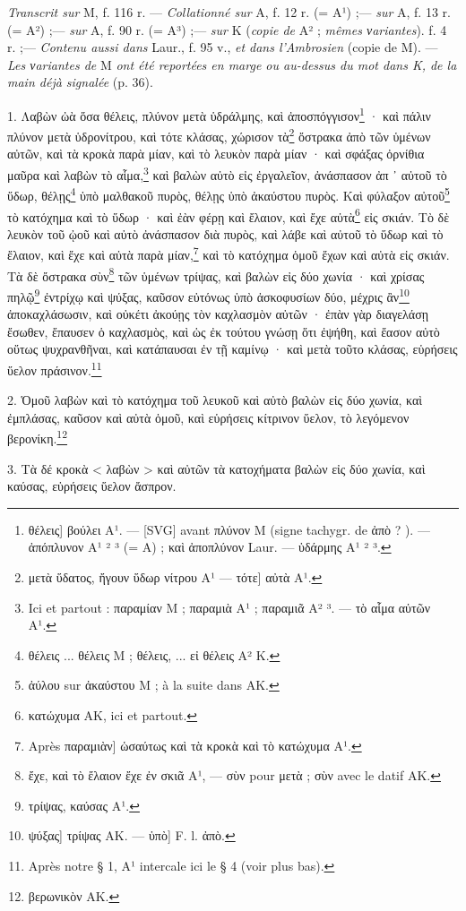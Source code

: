 \documentclass[a4paper, 11pt, oneside, polutonikogreek, french]{article}
\begin{document}
\emph{Transcrit sur} M, f. 116 r. --- \emph{Collationné sur} A, f. 12 r. (= A¹) ;--- \emph{sur} A, f. 13 r. (= A²) ;--- \emph{sur} A, f. 90 r. (= A³) ;--- \emph{sur} K (\emph{copie de} A² ; \emph{mêmes νariantes}). f. 4 r. ;--- \emph{Contenu aussi dans} Laur., f. 95 v., \emph{et dans l'Ambrosien} (copie de M). --- \emph{Les νariantes de} M \emph{ont été reportées en marge ou au-dessus du mot dans K, de la main déjà signalée} (p. 36).

1. Λαβὼν ὠὰ ὅσα θέλεις, πλύνον μετὰ ὑδράλμης, καὶ ἀποσπόγγισον\footnote{θέλεις] βούλει A¹. --- [SVG] avant πλύνον M (signe tachygr. de ἀπὸ ? ). --- ἀπόπλυνον A¹ ² ³ (= A) ; καὶ ἀποπλύνον Laur. --- ὑδάρμης A¹ ² ³.} · καὶ πάλιν πλύνον μετὰ ὑδρονίτρου, καὶ τότε κλάσας, χώρισον τὰ\footnote{μετὰ ὕδατος, ἤγουν ὕδωρ νίτρου A¹ --- τότε] αὐτὰ A¹.} ὄστρακα ἀπὸ τῶν ὑμένων αὐτῶν, καὶ τὰ κροκὰ παρὰ μίαν, καὶ τὸ λευκὸν παρὰ μίαν · καὶ σφάξας ὀρνίθια μαῦρα καὶ λαβὼν τὸ αἷμα,\footnote{Ici et partout : παραμίαν M ; παραμιὰ A¹ ; παραμιᾶ A² ³. --- τὸ αἷμα αὐτῶν A¹.} καὶ βαλὼν αὐτὸ εἰς ἐργαλεῖον, ἀνάσπασον ἀπ ᾽ αὐτοῦ τὸ ὕδωρ, θέλῃς\footnote{θέλεις ... θέλεις M ; θέλεις, ... εἰ θέλεις A² K.} ὑπὸ μαλθακοῦ πυρὸς, θέλῃς ὑπὸ ἀκαύστου πυρὸς. Καὶ φύλαξον αὐτοῦ\footnote{ἀύλου sur ἀκαύστου M ; à la suite dans AK.} τὸ κατόχημα καὶ τὸ ὕδωρ · καὶ ἐὰν φέρῃ καὶ ἔλαιον, καὶ ἔχε αὐτὰ\footnote{κατώχυμα AK, ici et partout.} εἰς σκιάν. Τὸ δὲ λευκὸν τοῦ ᾠοῦ καὶ αὐτὸ ἀνάσπασον διὰ πυρὸς, καὶ λάβε καὶ αὐτοῦ τὸ ὕδωρ καὶ τὸ ἔλαιον, καὶ ἔχε καὶ αὐτὰ παρὰ μίαν,\footnote{Après παραμιὰν] ὡσαύτως καὶ τὰ κροκὰ καὶ τὸ κατώχυμα A¹.} καὶ τὸ κατόχημα ὁμοῦ ἔχων καὶ αὐτὰ εἰς σκιάν. Τὰ δὲ ὄστρακα σὺν\footnote{ἔχε, καὶ τὸ ἔλαιον ἔχε ἐν σκιᾶ A¹, --- σὺν pour μετὰ ; σὺν avec le datif AK.} τῶν ὑμένων τρίψας, καὶ βαλὼν εἰς δύο χωνία · καὶ χρίσας πηλῷ\footnote{τρίψας, καύσας A¹.} ἐντρίχῳ καὶ ψύξας, καῦσον εὐτόνως ὑπὸ ἀσκοφυσίων δύο, μέχρις ἂν\footnote{ψύξας] τρίψας AK. --- ὑπὸ] F. l. ἀπὸ.} ἀποκαχλάσωσιν, καὶ οὐκέτι ἀκούῃς τὸν καχλασμὸν αὐτῶν · ἐπὰν γὰρ διαγελάσῃ ἔσωθεν, ἔπαυσεν ὁ καχλασμὸς, καὶ ὡς ἐκ τούτου γνώσῃ ὅτι ἐψήθη, καὶ ἔασον αὐτὸ οὕτως ψυχρανθῆναι, καὶ κατάπαυσαι ἐν τῇ καμίνῳ · καὶ μετὰ τοῦτο κλάσας, εὑρήσεις ὕελον πράσινον.\footnote{Après notre § 1, A¹ intercale ici le § 4 (voir plus bas).}

2. Ὁμοῦ λαβὼν καὶ τὸ κατόχημα τοῦ λευκοῦ καὶ αὐτὸ βαλὼν εἰς δύο χωνία, καὶ ἐμπλάσας, καῦσον καὶ αὐτὰ ὁμοῦ, καὶ εὑρήσεις κίτρινον ὕελον, τὸ λεγόμενον βερονίκη.\footnote{βερωνικὸν AK.}

3. Τὰ δέ κροκὰ < λαβὼν > καὶ αὐτῶν τὰ κατοχήματα βαλὼν εἰς δύο χωνία, καὶ καύσας, εὑρήσεις ὕελον ἄσπρον.
\end{document}
